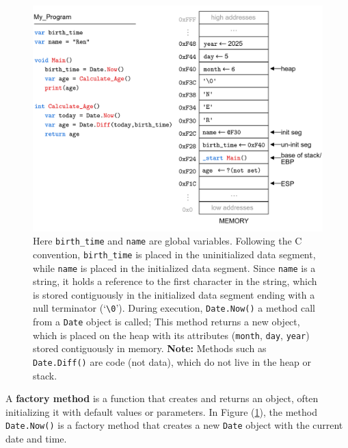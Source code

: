 \begin{figure}[!ht]
    \centering
    \includegraphics[width=\textwidth]{./Sections/stacks_heaps/heap_array.png}
    \caption{Here \texttt{birth\_time} and \texttt{name} are global variables. Following the C convention, \texttt{birth\_time} is placed in the 
    uninitialized data segment, while \texttt{name} is placed in the initialized data segment. Since \texttt{name} is a string, it holds a 
    reference to the first character in the string, which is stored contiguously in the initialized data segment ending with a null terminator (`\texttt{\textbackslash 0}').
    During execution, \texttt{Date.Now()} a method call from a \texttt{Date} object is called; This method returns a new object, which is placed on the heap with 
    its attributes (\texttt{month}, \texttt{day}, \texttt{year}) stored contiguously in memory. \textbf{Note:} Methods such as \texttt{Date.Diff()} are code (not data), 
    which do not live in the heap or stack.}
    \label{fig:heap_array}
\end{figure}

\begin{Def}

    A \textbf{factory method} is a function that creates and returns an object, often initializing it with default values or parameters.
    In Figure (\ref{fig:heap_array}), the method \texttt{Date.Now()} is a factory method that creates a new \texttt{Date} object with the current date and time.
\end{Def}

